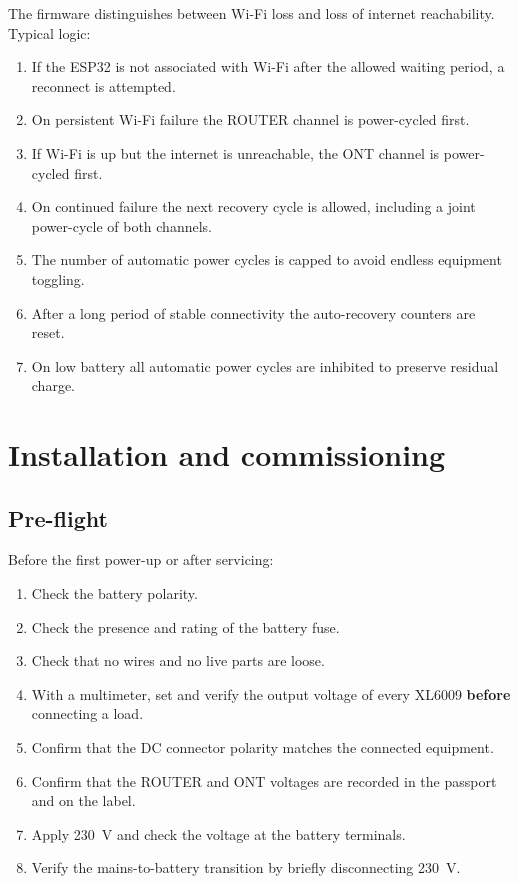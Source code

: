 \documentclass[11pt,a4paper]{article}
\begin{document}
The firmware distinguishes between Wi-Fi loss and loss of internet reachability. Typical logic:
\begin{enumerate}[leftmargin=8mm]
  \item If the ESP32 is not associated with Wi-Fi after the allowed waiting period, a reconnect is attempted.
  \item On persistent Wi-Fi failure the ROUTER channel is power-cycled first.
  \item If Wi-Fi is up but the internet is unreachable, the ONT channel is power-cycled first.
  \item On continued failure the next recovery cycle is allowed, including a joint power-cycle of both channels.
  \item The number of automatic power cycles is capped to avoid endless equipment toggling.
  \item After a long period of stable connectivity the auto-recovery counters are reset.
  \item On low battery all automatic power cycles are inhibited to preserve residual charge.
\end{enumerate}

\section{Installation and commissioning}

\subsection{Pre-flight}
Before the first power-up or after servicing:
\begin{enumerate}[leftmargin=8mm]
  \item Check the battery polarity.
  \item Check the presence and rating of the battery fuse.
  \item Check that no wires and no live parts are loose.
  \item With a multimeter, set and verify the output voltage of every XL6009 \textbf{before} connecting a load.
  \item Confirm that the DC connector polarity matches the connected equipment.
  \item Confirm that the ROUTER and ONT voltages are recorded in the passport and on the label.
  \item Apply 230~V and check the voltage at the battery terminals.
  \item Verify the mains-to-battery transition by briefly disconnecting 230~V.
\end{enumerate}
\end{document}
